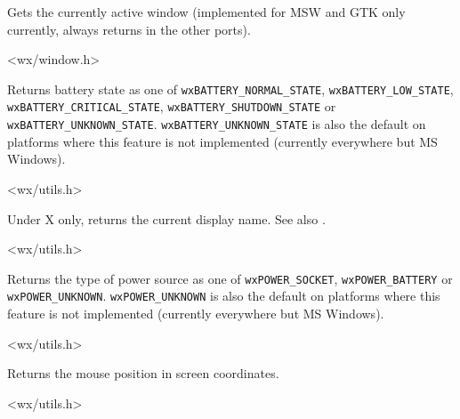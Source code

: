 \label{wxgetactivewindow}


Gets the currently active window (implemented for MSW and GTK only currently,
always returns \NULL in the other ports).


<wx/window.h>


\label{wxgetbatterystate}


Returns battery state as one of \texttt{wxBATTERY\_NORMAL\_STATE},
\texttt{wxBATTERY\_LOW\_STATE}, \texttt{wxBATTERY\_CRITICAL\_STATE},
\texttt{wxBATTERY\_SHUTDOWN\_STATE} or \texttt{wxBATTERY\_UNKNOWN\_STATE}.
\texttt{wxBATTERY\_UNKNOWN\_STATE} is also the default on platforms where
this feature is not implemented (currently everywhere but MS Windows).


<wx/utils.h>


\label{wxgetdisplayname}


Under X only, returns the current display name. See also .


<wx/utils.h>


\label{wxgetpowertype}


Returns the type of power source as one of \texttt{wxPOWER\_SOCKET},
\texttt{wxPOWER\_BATTERY} or \texttt{wxPOWER\_UNKNOWN}.
\texttt{wxPOWER\_UNKNOWN} is also the default on platforms where this
feature is not implemented (currently everywhere but MS Windows).


<wx/utils.h>


\label{wxgetmouseposition}


Returns the mouse position in screen coordinates.


<wx/utils.h>


